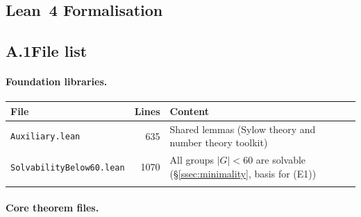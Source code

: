 \documentclass[sn-mathphys-num,Numbered]{sn-jnl}
\theoremstyle{thmstyleone}
\theoremstyle{thmstylethree}
\theoremstyle{thmstyletwo}
\begin{document}
\begin{appendices}

\section{Lean~4 Formalisation}
\label{app:lean}

\subsection*{A.1\quad File list}

\paragraph{Foundation libraries.}


\vspace{6pt}
\noindent{}
\label{tab:lean-foundation}
\begin{tabular}{@{}p{5.5cm}rp{5cm}@{}}
\toprule
File & Lines & Content \\
\midrule
\texttt{Auxiliary.lean} & 635 &
  Shared lemmas (Sylow theory and number theory toolkit) \\
\texttt{SolvabilityBelow60.lean} & 1070 &
  All groups $|G|<60$ are solvable (\S\ref{ssec:minimality}, basis for (E1)) \\
\botrule
\end{tabular}
\vspace{4pt}


\paragraph{Core theorem files.}



\end{appendices}
\end{document}

